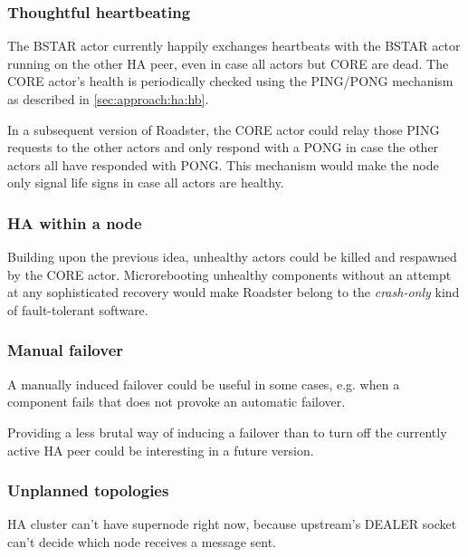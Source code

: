 \subsubsection{Thoughtful heartbeating}\label{sec:discussion:imp:ha:hb}
The BSTAR actor currently happily exchanges heartbeats with the BSTAR actor
running on the other HA peer, even in case all actors but CORE are dead. The
CORE actor's health is periodically checked using the PING/PONG mechanism as
described in \autoref{sec:approach:ha:hb}.

In a subsequent version of Roadster, the CORE actor could relay those PING
requests to the other actors and only respond with a PONG in case the other
actors all have responded with PONG. This mechanism would make the node only
signal life signs in case all actors are healthy.

\subsubsection{HA within a node}
Building upon the previous idea, unhealthy actors could be killed and respawned
by the CORE actor.  Microrebooting unhealthy components without an attempt at
any sophisticated recovery would make Roadster belong to the \emph{crash-only} kind of fault-tolerant software.

\subsubsection{Manual failover}\label{sec:discussion:ha:manual-failover}
A manually induced failover could be useful in some cases, e.g. when a
component fails that does not provoke an automatic failover.

Providing a less brutal way of inducing a failover than to turn off the
currently active HA peer could be interesting in a future version.

\subsubsection{Unplanned topologies}
HA cluster can't have supernode right now, because upstream's DEALER socket
can't decide which node receives a message sent.

